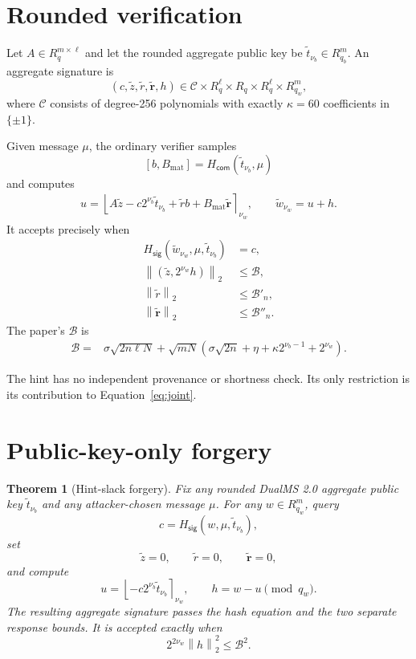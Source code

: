 \documentclass[10pt,a4paper]{article}
\newtheorem{theorem}{Theorem}
\newcommand{\norm}[1]{\left\lVert #1\right\rVert_2}
\newcommand{\roundnu}[2]{\left\lfloor #1\right\rceil_{#2}}
\newcommand{\Hsig}{H_{\mathsf{sig}}}
\newcommand{\Hcom}{H_{\mathsf{com}}}
\begin{document}
\section{Rounded verification}
\label{sec:verify}

Let $A\in R_q^{m\times\ell}$ and let the rounded aggregate public key be
$\widetilde t_{\nu_b}\in R_{q_b}^{m}$. An aggregate signature is
\[
  (c,\widetilde z,\widetilde r,\widetilde{\boldsymbol r},h)
  \in \mathcal C\times R_q^\ell\times R_q\times R_q^\ell\times R_{q_w}^m,
\]
where $\mathcal C$ consists of degree-256 polynomials with exactly $\kappa=60$
coefficients in $\{\pm1\}$.

Given message $\mu$, the ordinary verifier samples
\[
  [b,B_{\mathrm{mat}}]=\Hcom(\widetilde t_{\nu_b},\mu)
\]
and computes
\begin{align*}
  u=\roundnu{
      A\widetilde z
      -c2^{\nu_b}\widetilde t_{\nu_b}
      +\widetilde r b
      +B_{\mathrm{mat}}\widetilde{\boldsymbol r}
    }{\nu_w},
  \qquad
  \widetilde w_{\nu_w}=u+h.
\end{align*}
It accepts precisely when
\begin{align}
  \Hsig(\widetilde w_{\nu_w},\mu,\widetilde t_{\nu_b})&=c,
    \label{eq:hash}\\
  \norm{(\widetilde z,2^{\nu_w}h)}&\leq \mathcal B,
    \label{eq:joint}\\
  \norm{\widetilde r}&\leq \mathcal B'_n,
    \label{eq:rbound}\\
  \norm{\widetilde{\boldsymbol r}}&\leq \mathcal B''_n.
    \label{eq:rbarbound}
\end{align}
The paper's $\mathcal B$ is
\begin{align}
 \mathcal B={}&\sigma\sqrt{2n\ell N}
 +\sqrt{mN}\left(
    \sigma\sqrt{2n}+\eta+\kappa2^{\nu_b-1}+2^{\nu_w}
  \right).
 \label{eq:B}
\end{align}

The hint has no independent provenance or shortness check. Its only
restriction is its contribution to Equation~\eqref{eq:joint}.

\section{Public-key-only forgery}
\label{sec:attack}

\begin{theorem}[Hint-slack forgery]
Fix any rounded DualMS 2.0 aggregate public key
$\widetilde t_{\nu_b}$ and any attacker-chosen message $\mu$. For any
$w\in R_{q_w}^{m}$, query
\[
  c=\Hsig(w,\mu,\widetilde t_{\nu_b}),
\]
set
\[
  \widetilde z=0,\qquad \widetilde r=0,\qquad
  \widetilde{\boldsymbol r}=0,
\]
and compute
\[
  u=\roundnu{-c2^{\nu_b}\widetilde t_{\nu_b}}{\nu_w},
  \qquad h=w-u\pmod{q_w}.
\]
The resulting aggregate signature passes the hash equation and the two
separate response bounds. It is accepted exactly when
\[
  2^{2\nu_w}\norm{h}^2\leq \mathcal B^2.
\]
\end{theorem}
\end{document}
